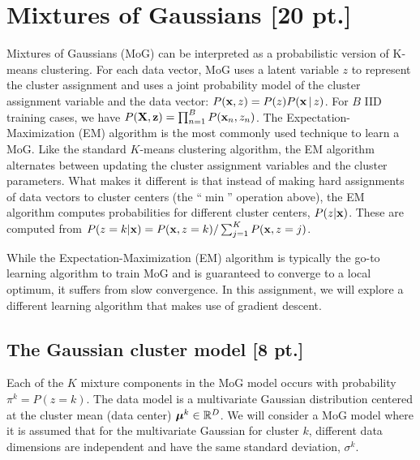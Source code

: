 \documentclass[12pt,letterpaper]{article}
\begin{document}
\section{Mixtures of Gaussians [20 pt.]}

Mixtures of Gaussians (MoG) can be interpreted as a probabilistic version of K-means clustering. For each data vector, MoG uses a latent variable $z$ to represent the cluster assignment and uses a joint probability model of the cluster assignment variable and the data vector: $P(\bold{x}, z) = P(z)P(\bold{x} \, | \, z)$. For $B$ IID training cases, we have $P({\bold{X},\bold{z}}) = \prod_{n=1}^B P(\bold{x}_n,z_n)$. The Expectation-Maximization (EM) algorithm is the most commonly used technique to learn a MoG. Like the standard $K$-means clustering algorithm, the EM algorithm alternates between updating the cluster assignment variables and the cluster parameters. What makes it different is that instead of making hard assignments of data vectors to cluster centers (the ``$\min$'' operation above), the EM algorithm computes probabilities for different cluster centers, $P(z|\bold{x})$. These are computed from $P(z=k|\bold{x}) = P(\bold{x},z=k)/\sum_{j=1}^K P(\bold{x},z=j)$.

While the Expectation-Maximization (EM) algorithm is typically the go-to learning algorithm to train MoG and is guaranteed to converge to a local optimum, it suffers from slow convergence. In this assignment, we will explore a different learning algorithm that makes use of gradient descent.

\subsection{The Gaussian cluster model [8 pt.]}

Each of the $K$ mixture components in the MoG model occurs with probability $\pi^k = P(z=k)$. The data model is a multivariate Gaussian distribution centered at the cluster mean (data center) $\boldsymbol{\mu}^k \in \mathbb{R}^D$. We will consider a MoG model where it is assumed that for the multivariate Gaussian for cluster $k$, different data dimensions are independent and have the same standard deviation, ${\sigma^k}$. 
\end{document}
